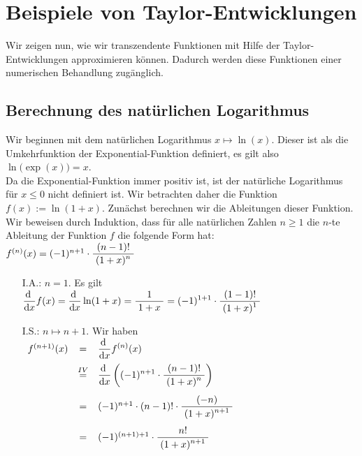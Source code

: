 \section{Beispiele von Taylor-Entwicklungen}
Wir zeigen nun, wie wir transzendente Funktionen 
mit Hilfe der Taylor-Entwicklungen approximieren k\"onnen.  Dadurch werden diese Funktionen
einer numerischen Behandlung zug\"anglich.  

\subsection{Berechnung des nat\"urlichen Logarithmus}
Wir beginnen mit dem nat\"urlichen Logarithmus $x \mapsto \ln(x)$.  Dieser ist als die Umkehrfunktion der
Exponential-Funktion definiert, es gilt also
\\[0.2cm]
\hspace*{1.3cm}
$\ln\bigl(\exp(x)\bigr) = x$.
\\[0.2cm]
Da die Exponential-Funktion immer positiv ist, ist der nat\"urliche Logarithmus f\"ur $x \leq 0$  nicht
definiert ist.  Wir betrachten daher die Funktion $f(x)  := \ln(1 + x)$.  Zun\"achst berechnen wir die
Ableitungen dieser Funktion.  Wir beweisen durch Induktion, dass f\"ur alle
nat\"urlichen Zahlen $n\geq 1$ die $n$-te Ableitung der Funktion $f$ die folgende Form hat:
\\[0.2cm]
\hspace*{1.3cm} $f^{(n)}(x) = (-1)^{n+1}\cdot \displaystyle\frac{\;\displaystyle(n-1)!\;}{\;\displaystyle(1+x)^n\;}$
\begin{enumerate}
\item[I.A.:] $n=1$.  Es gilt
  \\[0.2cm]
  \hspace*{1.3cm}
  $\displaystyle\frac{\textrm{d}\;}{\textrm{d}x} f(x) = \displaystyle\frac{\textrm{d}\;}{\textrm{d}x} \ln(1+x) = \displaystyle\frac{\;\displaystyle1\;}{\;\displaystyle1+x\;} = (-1)^{1+1}\cdot \displaystyle\frac{\;\displaystyle(1-1)!\;}{\;\displaystyle(1+x)^1\;}$
\item[I.S.:] $n \mapsto n+1$.  Wir haben 
  \\[0.3cm]
  \hspace*{1.3cm}
  $
  \begin{array}[t]{lcl}  
    f^{(n+1)}(x) & = & \displaystyle\frac{\textrm{d}\;}{\textrm{d}x} f^{(n)}(x) \\[0.3cm]
    & \stackrel{IV}{=} & \displaystyle\frac{\textrm{d}\;}{\textrm{d}x} \left((-1)^{n+1}\cdot \displaystyle\frac{\;\displaystyle(n-1)!\;}{\;\displaystyle(1+x)^n\;}\right) \\[0.5cm]
    & = & (-1)^{n+1}\cdot (n-1)!\cdot \displaystyle\frac{\;\displaystyle(-n)\;}{\;\displaystyle(1+x)^{n+1}\;} \\[0.5cm]
    & = & (-1)^{(n+1)+1}\cdot \displaystyle\frac{\;\displaystyle n!\;}{\;\displaystyle(1+x)^{n+1}\;} \\[0.3cm]
  \end{array}
  $  
\end{enumerate}
